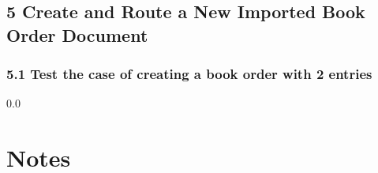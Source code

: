 \subsection*{5 Create and Route a New Imported Book Order Document}
\subsubsection*{5.1 Test the case of creating a book order with 2
  entries}

\newpage
  {\setlength{\baselineskip}%
           {0.0\baselineskip}
  \section*{Notes}
  \hrulefill \par}
